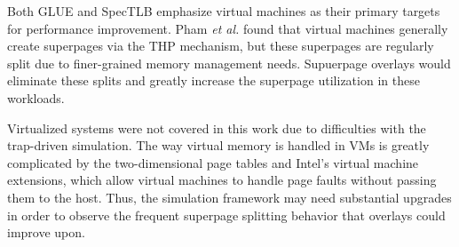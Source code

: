Both GLUE \cite{Pham} and SpecTLB \cite{Barr} emphasize virtual machines as their primary targets for performance improvement. Pham \emph{et al.} found that virtual machines generally create superpages via the THP mechanism, but these superpages are regularly split due to finer-grained memory management needs. Supuerpage overlays would eliminate these splits and greatly increase the superpage utilization in these workloads.

Virtualized systems were not covered in this work due to difficulties with the trap-driven simulation. The way virtual memory is handled in VMs is greatly complicated by the two-dimensional page tables and Intel's virtual machine extensions, which allow virtual machines to handle page faults without passing them to the host. Thus, the simulation framework may need substantial upgrades in order to observe the frequent superpage splitting behavior that overlays could improve upon.
